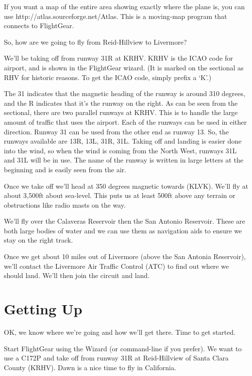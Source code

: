 If you want a map of the entire area showing exactly where the plane is, you can use http://atlas.sourceforge.net/Atlas. This is a moving-map program that connects to FlightGear.

So, how are we going to fly from Reid-Hillview to Livermore?

We'll be taking off from runway 31R at KRHV. KRHV is the ICAO code for  airport, and is shown in the FlightGear wizard. (It is marked on the sectional as RHV for historic reasons. To get the ICAO code, simply prefix a `K'.)

The 31 indicates that the magnetic heading of the runway is around 310 degrees, and the R indicates that it's the runway on the right. As can be seen from the sectional, there are two parallel runways at KRHV. This is to handle the large amount of traffic that uses the airport. Each of the runways can be used in either direction. Runway 31 can be used from the other end as runway 13. So, the runways available are 13R, 13L, 31R, 31L. Taking off and landing is easier done into the wind, so when the wind is coming from the North West, runways 31L and 31L will be in use. The name of the runway is written in large letters at the beginning and is easily seen from the air. 

Once we take off we'll head at 350 degrees magnetic towards  (KLVK). We'll fly at about 3,500ft about sea-level. This puts us at least 500ft above any terrain or obstructions like radio masts on the way.

We'll fly over the Calaveras Reservoir then the San Antonio Reservoir. These are both large bodies of water and we can use them as navigation aids to ensure we stay on the right track.

Once we get about 10 miles out of Livermore (above the San Antonia Reservoir), we'll contact the Livermore Air Traffic Control (ATC) to find out where we should land. We'll then join the circuit and land.

\section{Getting Up}

OK, we know where we're going and how we'll get there. Time to get started.

Start FlightGear using the Wizard (or command-line if you prefer). We want to use a C172P and take off from runway 31R at Reid-Hillview of Santa Clara County (KRHV). Dawn is a nice time to fly in California.

